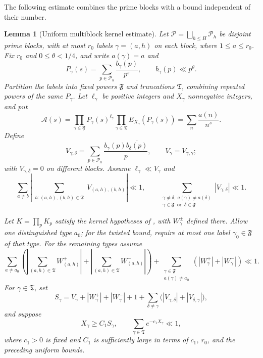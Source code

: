 \documentclass[oneside, 12pt]{amsart}
\newtheorem{lem}[thm]{Lemma}
\theoremstyle{definition}
\begin{document}
	{The following estimate combines the prime blocks with a
		bound independent of their number.}
	
	
	{
		\begin{lem}[Uniform multiblock kernel estimate]\label{multiBlockCombinatorialLemma}
			Let $\mathcal P=\bigsqcup_{h\leq H}\mathcal P_h$ be disjoint prime
			blocks, with at most $r_0$ labels $\gamma=(a,h)$ on each block, where
			$1\leq a\leq r_0$.  Fix $r_0$ and $0\leq\theta<1/4$, and write
			$a(\gamma)=a$ and
			\[
			P_\gamma(s)=\sum_{p\in\mathcal P_h}
			\frac{b_\gamma(p)}{p^s},
			\qquad b_\gamma(p)\ll p^\theta.
			\]
			Partition the labels into fixed powers $\mathfrak F$ and truncations
			$\mathfrak T$, combining repeated powers of the same $P_\gamma$.
			Let $\ell_\gamma$ be positive integers and $X_\gamma$ nonnegative
			integers, and put
			\begin{equation}\label{multiblockPolynomialDefinition}
				\mathcal A(s)=
				\prod_{\gamma\in\mathfrak F}P_\gamma(s)^{\ell_\gamma}
				\prod_{\gamma\in\mathfrak T}E_{X_\gamma}(P_\gamma(s))
				=\sum_n\frac{a(n)}{n^s}.
			\end{equation}
			Define
			\[
			V_{\gamma,\delta}
			=\sum_{p\in\mathcal P_h}
			\frac{b_\gamma(p)\overline{b_\delta(p)}}p,
			\qquad V_\gamma=V_{\gamma,\gamma};
			\]
			with $V_{\gamma,\delta}=0$ on different blocks.  Assume
			$\ell_\gamma\ll V_\gamma$ and
			\begin{equation}\label{multiblockAggregateCovariance}
				\sum_{a\neq b}
				\left|
				\sum_{\substack{h:(a,h),(b,h)\in\mathfrak T}}
				V_{(a,h),(b,h)}
				\right|\ll1,
				\qquad
				\sum_{\substack{\gamma\neq\delta,\ a(\gamma)\neq a(\delta)\\
						\gamma\in\mathfrak F\ {\text{ or }}\ \delta\in\mathfrak F}}
				|V_{\gamma,\delta}|\ll1.
			\end{equation}
			
			Let $K=\prod_pK_p$ satisfy the kernel hypotheses of
			, with $W_\gamma^\pm$ defined
			there.  Allow one distinguished type $a_0$; for the twisted bound,
			require at most one label $\gamma_0\in\mathfrak F$ of that type.
			For the remaining types assume
			\begin{equation}\label{multiblockAggregateLinear}
				\sum_{a\neq a_0}
				\left(
				\left|\sum_{(a,h)\in\mathfrak T}W_{(a,h)}^+\right|
				+
				\left|\sum_{(a,h)\in\mathfrak T}W_{(a,h)}^-\right|
				\right)
				+
				\sum_{\substack{\gamma\in\mathfrak F\\a(\gamma)\neq a_0}}
				(|W_\gamma^+|+|W_\gamma^-|)
				\ll1.
			\end{equation}
			For $\gamma\in\mathfrak T$, set
			\[
			S_\gamma=V_\gamma+|W_\gamma^+|+|W_\gamma^-|+1
			+\sum_{\delta\neq\gamma}
			\bigl(|V_{\gamma,\delta}|+|V_{\delta,\gamma}|\bigr),
			\]
			and suppose
			\begin{equation}\label{multiblockCutoffConditions}
				X_\gamma\geq C_1S_\gamma,
				\qquad
				\sum_{\gamma\in\mathfrak T}e^{-c_1X_\gamma}\ll1,
			\end{equation}
			where $c_1>0$ is fixed and $C_1$ is sufficiently large in terms of
			$c_1$, $r_0$, and the preceding uniform bounds.
			

\end{lem}}
\end{document}
